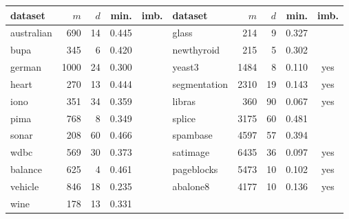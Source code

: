 \begin{tabular}{lrrrc|lrrrc}
\toprule
dataset & $m$ & $d$ & min. & imb. & dataset & $m$ & $d$ & min. & imb. \\
\midrule
australian & 690 & 14 & 0.445 &  & glass & 214 & 9 & 0.327 &  \\
bupa & 345 & 6 & 0.420 &  & newthyroid & 215 & 5 & 0.302 &  \\
german & 1000 & 24 & 0.300 &  & yeast3 & 1484 & 8 & 0.110 & yes \\
heart & 270 & 13 & 0.444 &  & segmentation & 2310 & 19 & 0.143 & yes \\
iono & 351 & 34 & 0.359 &  & libras & 360 & 90 & 0.067 & yes \\
pima & 768 & 8 & 0.349 &  & splice & 3175 & 60 & 0.481 &  \\
sonar & 208 & 60 & 0.466 &  & spambase & 4597 & 57 & 0.394 &  \\
wdbc & 569 & 30 & 0.373 &  & satimage & 6435 & 36 & 0.097 & yes \\
balance & 625 & 4 & 0.461 &  & pageblocks & 5473 & 10 & 0.102 & yes \\
vehicle & 846 & 18 & 0.235 &  & abalone8 & 4177 & 10 & 0.136 & yes \\
wine & 178 & 13 & 0.331 &  &  &  &  &  &  \\
\bottomrule
\end{tabular}
